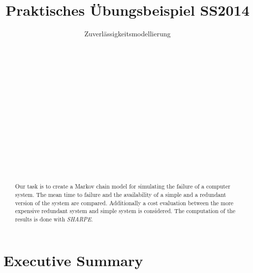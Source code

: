 \documentclass[
            a4paper
            ]{scrartcl}%
\title{Praktisches Übungsbeispiel SS2014}
\subtitle{Zuverlässigkeitsmodellierung}
\author{
 \authorname{Markus Kessler} \\
 \studentnumber{1225380} \\
 \curriculum{033 535}\\
 \email{e1225380@student.tuwien.ac.at}\\\\
 \authorname{Mathias Lechner} \\
 \studentnumber{1225134} \\
 \curriculum{033 535}\\
 \email{e1225134@student.tuwien.ac.at}\\\\
 \authorname{Martin Wührer} \\
 \studentnumber{1225177} \\
 \curriculum{033 535}\\
 \email{e1225177@student.tuwien.ac.at}
}
\begin{document}
\renewcommand*{\Frefeqname}{Gleichung}
\renewcommand*{\Freffigname}{Abbildung}

\maketitle
\newpage

\tableofcontents
\newpage
\begin{abstract}
Our task is to create a Markov chain model for simulating the failure of a computer system. The mean time to failure and the availability of a simple and a redundant version of the system are compared. Additionally a cost evaluation between the more expensive redundant system and simple system is considered.
The computation of the results is done with \emph{SHARPE}.
\end{abstract}

\section{Executive Summary}

\newpage
\end{document}
